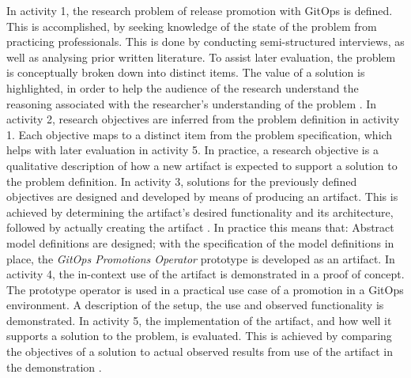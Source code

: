 In activity 1,
the research problem of
release promotion with GitOps
is defined.
This is accomplished, by
seeking knowledge of the state of the problem
from practicing professionals.
This is done by conducting
semi-structured interviews,
as well as analysing prior written literature.
To assist later evaluation,
the problem is conceptually broken down into distinct items.
%
%
The value of a solution is highlighted,
in order to help the audience of the research
understand the reasoning associated with the
researcher's understanding of the problem
\autocite{designScienceResearchMethodologyForInformationSystemsResearch}.
%
In activity 2,
research objectives are inferred from the problem definition in activity 1.
Each objective maps to a distinct item from the problem specification,
which helps with later evaluation in activity 5.
In practice, a research objective is a qualitative description of
how a new artifact is expected to support a solution to the problem definition.
%
In activity 3,
solutions for the previously defined objectives are designed and developed
by means of producing an artifact.
This is achieved by
determining the artifact's desired functionality and its architecture,
followed by actually creating the artifact
\autocite{designScienceResearchMethodologyForInformationSystemsResearch}.
In practice this means that:
Abstract model definitions are designed;
with the specification of the model definitions in place,
the \textit{GitOps Promotions Operator} prototype is developed as an artifact.
%
In activity 4,
the in-context use of the artifact is demonstrated in a proof of concept.
The prototype operator is used in a practical use case of a promotion in a GitOps environment.
A description of the setup, the use and observed functionality is demonstrated.
%
In activity 5,
the implementation of the artifact,
and how well it supports a solution to the problem,
is evaluated.
This is achieved by
comparing the objectives of a solution to actual observed results
from use of the artifact in the demonstration
\autocite{designScienceResearchMethodologyForInformationSystemsResearch}.
